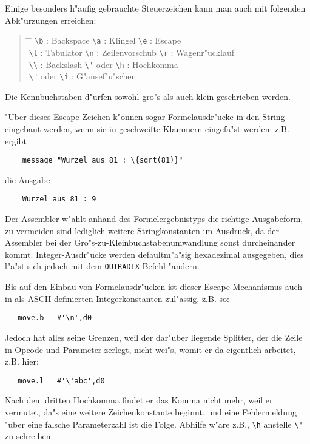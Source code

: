 \documentclass[12pt,a4paper,twoside]{report}
\newcommand{\tty}[1]{{\tt #1}}
\begin{document}
Einige besonders h"aufig gebrauchte Steuerzeichen kann man auch mit
folgenden Abk"urzungen erreichen:
\begin{quote}\begin{tabbing}
\hspace{4cm} \= \hspace{4cm} \= \kill
\verb!\b! : Backspace \> \verb!\a! : Klingel        \> \verb!\e! : Escape \\
\verb!\t! : Tabulator \> \verb!\n! : Zeilenvorschub \> \verb!\r! : Wagenr"ucklauf \\
\verb!\\! : Backslash \> \verb!\'! oder \verb!\h! : Hochkomma \\
\verb!\"! oder \verb!\i! : G"ansef"u"schen \\
\end{tabbing}\end{quote}
Die Kennbuchstaben d"urfen sowohl gro"s als auch klein geschrieben
werden.
\par
"Uber dieses Escape-Zeichen k"onnen sogar Formelausdr"ucke in den
String eingebaut werden, wenn sie in geschweifte Klammern eingefa"st
werden: z.B. ergibt
\begin{verbatim}
    message "Wurzel aus 81 : \{sqrt(81)}"
\end{verbatim}
die Ausgabe
\begin{verbatim}
    Wurzel aus 81 : 9
\end{verbatim}
Der Assembler w"ahlt anhand des Formelergebnistyps die richtige
Ausgabeform, zu vermeiden sind lediglich weitere Stringkonstanten
im Ausdruck, da der Assembler bei der Gro"s-zu-Kleinbuchstabenumwandlung
sonst durcheinander kommt.  Integer-Ausdr"ucke werden defaultm"a"sig
hexadezimal ausgegeben, dies l"a"st sich jedoch mit dem
\tty{OUTRADIX}-Befehl "andern.
\par
Bis auf den Einbau von Formelausdr"ucken ist dieser Escape-Mechanismus
auch in als ASCII definierten Integerkonstanten zul"assig, z.B. so:
\begin{verbatim}
   move.b   #'\n',d0
\end{verbatim}
Jedoch hat alles seine Grenzen, weil der dar"uber liegende Splitter, der
die Zeile in Opcode und Parameter zerlegt, nicht wei"s, womit er da
eigentlich arbeitet, z.B. hier:
\begin{verbatim}
   move.l   #'\'abc',d0
\end{verbatim}
Nach dem dritten Hochkomma findet er das Komma nicht mehr, weil er
vermutet, da"s eine weitere Zeichenkonstante beginnt, und eine
Fehlermeldung "uber eine falsche Parameterzahl ist die Folge.  Abhilfe
w"are z.B., \verb!\h! anstelle \verb!\'! zu schreiben.
\end{document}
